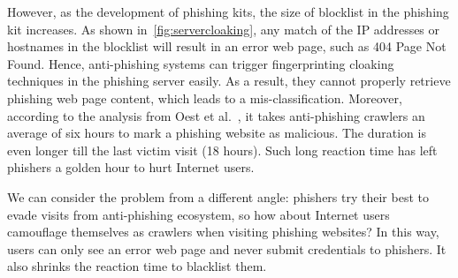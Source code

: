 However, as the development of phishing kits, the size of blocklist in the phishing kit increases.
As shown in~\autoref{fig:servercloaking}, any match of the IP addresses or hostnames in the blocklist will result in an error web page, such as 404 Page Not Found.
Hence, anti-phishing systems can trigger fingerprinting cloaking techniques in the phishing server easily.
As a result, they cannot properly retrieve phishing web page content, which leads to a mis-classification.
Moreover, according to the analysis from Oest et al.~\cite{oest2020sunrise}, it takes anti-phishing crawlers an average of six hours to mark a phishing website as malicious.
The duration is even longer till the last victim visit (18 hours).
Such long reaction time has left phishers a golden hour to hurt Internet users.

We can consider the problem from a different angle: phishers try their best to evade visits from anti-phishing ecosystem, so how about Internet users camouflage themselves as crawlers when visiting phishing websites?
In this way, users can only see an error web page and never submit credentials to phishers.
It also shrinks the reaction time to blacklist them.



